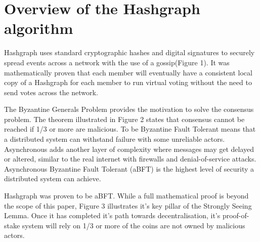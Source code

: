 \section{Overview of the Hashgraph algorithm}



Hashgraph uses standard cryptographic hashes and digital signatures to securely spread events across a network with the use of a gossip(Figure 1).%
It was mathematically proven that each member will eventually have a consistent local copy of a Hashgraph for each member to run virtual voting without the need to send votes across the network\cite{baird2016}.


The Byzantine Generals Problem\cite{shostak1982byzantine} provides the motivation to solve the consensus problem. The theorem illustrated in Figure 2 states that consensus cannot be reached if 1/3 or more are malicious. To be Byzantine Fault Tolerant means that a distributed system can withstand failure with some unreliable actors. Asynchronous adds another layer of complexity where messages may get delayed or altered, similar to the real internet with firewalls and denial-of-service attacks. Asynchronous Byzantine Fault Tolerant (aBFT) is the highest level of security a distributed system can achieve\cite{coq2018}.


Hashgraph was proven to be aBFT. While a full mathematical proof is beyond the scope of this paper, Figure 3 illustrates it's key pillar of the Strongly Seeing Lemma. Once it has completed it's path towards decentralisation, it's proof-of-stake system will rely on 1/3 or more of the coins are not owned by malicious actors. 

% 



